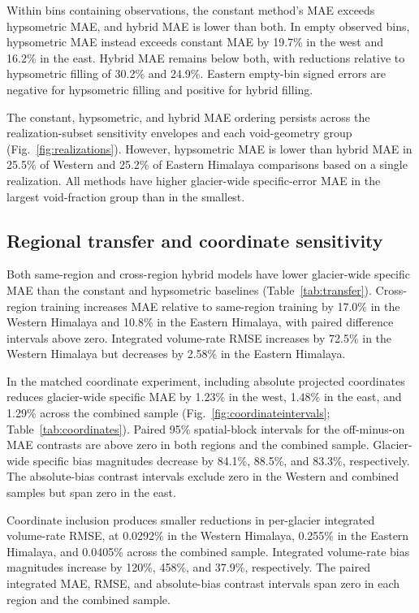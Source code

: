\documentclass[tc,manuscript]{copernicus}
\begin{document}
Within bins containing observations, the constant method's MAE exceeds hypsometric MAE, and hybrid MAE is lower than both. In empty observed bins, hypsometric MAE instead exceeds constant MAE by 19.7\% in the west and 16.2\% in the east. Hybrid MAE remains below both, with reductions relative to hypsometric filling of 30.2\% and 24.9\%. Eastern empty-bin signed errors are negative for hypsometric filling and positive for hybrid filling.

The constant, hypsometric, and hybrid MAE ordering persists across the realization-subset sensitivity envelopes and each void-geometry group (Fig.~\ref{fig:realizations}). However, hypsometric MAE is lower than hybrid MAE in 25.5\% of Western and 25.2\% of Eastern Himalaya comparisons based on a single realization. All methods have higher glacier-wide specific-error MAE in the largest void-fraction group than in the smallest. 

\subsection{Regional transfer and coordinate sensitivity}
Both same-region and cross-region hybrid models have lower glacier-wide specific MAE than the constant and hypsometric baselines (Table~\ref{tab:transfer}). Cross-region training increases MAE relative to same-region training by 17.0\% in the Western Himalaya and 10.8\% in the Eastern Himalaya, with paired difference intervals above zero. Integrated volume-rate RMSE increases by 72.5\% in the Western Himalaya but decreases by 2.58\% in the Eastern Himalaya.


\FloatBarrier

In the matched coordinate experiment, including absolute projected coordinates reduces glacier-wide specific MAE by 1.23\% in the west, 1.48\% in the east, and 1.29\% across the combined sample (Fig.~\ref{fig:coordinateintervals}; Table~\ref{tab:coordinates}). Paired 95\% spatial-block intervals for the off-minus-on MAE contrasts are above zero in both regions and the combined sample. Glacier-wide specific bias magnitudes decrease by 84.1\%, 88.5\%, and 83.3\%, respectively. The absolute-bias contrast intervals exclude zero in the Western and combined samples but span zero in the east.

Coordinate inclusion produces smaller reductions in per-glacier integrated volume-rate RMSE, at 0.0292\% in the Western Himalaya, 0.255\% in the Eastern Himalaya, and 0.0405\% across the combined sample. Integrated volume-rate bias magnitudes increase by 120\%, 458\%, and 37.9\%, respectively. The paired integrated MAE, RMSE, and absolute-bias contrast intervals span zero in each region and the combined sample.
\end{document}
